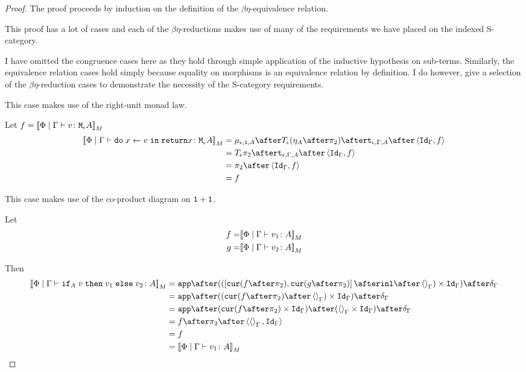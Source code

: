 \documentclass{Report}
\begin{document}
\begin{proof}
    The proof proceeds by induction on the definition of the $\beta\eta$-equivalence relation.

    This proof has a lot of cases and each of the $\beta\eta$-reductions makes use of many of the requirements we have placed on the indexed S-category.

    I have omitted the congruence cases here as they hold through simple application of the inductive hypothesis on sub-terms. Similarly, the equivalence relation cases hold simply because equality on morphisms is an equivalence relation by definition. I do however, give a selection of the $\beta\eta$-reduction cases to demonstrate the necessity of the S-category requirements.

This case makes use of the right-unit monad law.

Let $f = {\bf [\![}\Phi\mid\Gamma \vdash v \colon \texttt{M}_{\epsilon}{A}{\bf ]\!]}_M$ 
    \begin{equation}
    \begin{split}
        \deno{\gpetyperelation{\doin{x}{v}{\return{x}}}{\mea}}  & = \bind{\e}{\1}{A} \after \T{\e}{(\point{A} \after \pp)} \after \tstrength{\e}{\G}{A}\after \pr{\idg}{f} \\
        & = \T{\e}{\pp} \after \tstrength{\e}{\G}{A} \after \pr {\idg}{f} \\
        & = \pp \after \pr{\idg}{f}\\
        & = f
    \end{split}
\end{equation}

This case makes use of the co-product diagram on $\texttt{1} + \texttt{1}$.

Let
\begin{align}
    f = &{\bf [\![}\Phi\mid\Gamma \vdash v_1 \colon A{\bf ]\!]}_M\\
    g = &{\bf [\![}\Phi\mid\Gamma \vdash v_2 \colon A{\bf ]\!]}_M\\
\end{align}

Then
\begin{equation}
    \begin{split}
        \deno{\gpetyperelation{\pifthenelse{A}{v}{v_1}{v_2}}{A}} & = \ifMorph{\inl\after\term{\G}}{f}{g} \\
        & = \app\after((\cur{f\after\pp}\after\term{\G})\times\idg)\after\diag{\G}\\
        & = \app\after(\cur{f\after\pp}\times\idg)\after(\term{\G}\times\idg)\after\diag{\G}\\
        & = f\after\pp\after\pr{\term{\G}}{\idg}\\
        & = f \\
        & = \deno{\gpetyperelation{v_1}{A}}\\
    \end{split}
\end{equation}


\end{proof}
\end{document}

